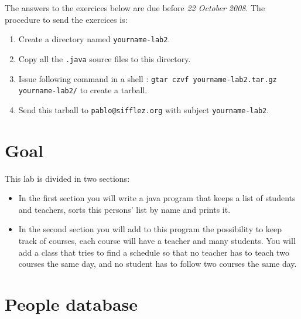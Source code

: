 \documentclass{exercices}
\begin{document}

The answers to the exercices below are due before \emph{22 October 2008}. 
The procedure to send the exercices is:
\begin{enumerate}
  \item Create a directory named \verb!yourname-lab2!.
  \item Copy all the \verb!.java! source files to this directory.
  \item Issue following command in a shell : \verb!gtar czvf yourname-lab2.tar.gz yourname-lab2/!
        to create a tarball.
  \item Send this tarball to \verb!pablo@sifflez.org! with subject \verb!yourname-lab2!.
\end{enumerate}

\section{Goal}
This lab is divided in two sections:
\begin{itemize}
\item
In the first section you will write a java program that keeps a list of students and teachers, sorts
this persons' list by name and prints it.
\item
In the second section you will add to this program the possibility to keep track of courses, each course
will have a teacher and many students. You will add a class that tries to find a schedule so that
no teacher has to teach two courses the same day, and no student has to follow two courses the same day.
\end{itemize}

\section{People database}
\end{document}

